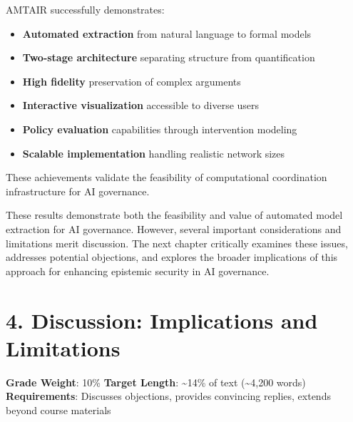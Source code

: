 \documentclass[
  11pt,
  letterpaper,
]{book}
\providecommand{\tightlist}{%
  \setlength{\itemsep}{0pt}\setlength{\parskip}{0pt}}
\begin{document}

AMTAIR successfully demonstrates:

\begin{itemize}
\tightlist
\item
  \textbf{Automated extraction} from natural language to formal models
\item
  \textbf{Two-stage architecture} separating structure from
  quantification
\item
  \textbf{High fidelity} preservation of complex arguments
\item
  \textbf{Interactive visualization} accessible to diverse users
\item
  \textbf{Policy evaluation} capabilities through intervention modeling
\item
  \textbf{Scalable implementation} handling realistic network sizes
\end{itemize}

These achievements validate the feasibility of computational
coordination infrastructure for AI governance.

These results demonstrate both the feasibility and value of automated
model extraction for AI governance. However, several important
considerations and limitations merit discussion. The next chapter
critically examines these issues, addresses potential objections, and
explores the broader implications of this approach for enhancing
epistemic security in AI governance.


\chapter*{4. Discussion: Implications and
Limitations}\label{sec-discussion}


\begin{tcolorbox}[enhanced jigsaw, opacityback=0, leftrule=.75mm, breakable, coltitle=black, colbacktitle=quarto-callout-note-color!10!white, bottomrule=.15mm, rightrule=.15mm, toprule=.15mm, left=2mm, bottomtitle=1mm, arc=.35mm, toptitle=1mm, titlerule=0mm, title=\textcolor{quarto-callout-note-color}{\faInfo}\hspace{0.5em}{Chapter Overview}, opacitybacktitle=0.6, colframe=quarto-callout-note-color-frame, colback=white]

\textbf{Grade Weight}: 10\% \textbar{} \textbf{Target Length}:
\textasciitilde14\% of text (\textasciitilde4,200 words)\\
\textbf{Requirements}: Discusses objections, provides convincing
replies, extends beyond course materials

\end{tcolorbox}
\end{document}
